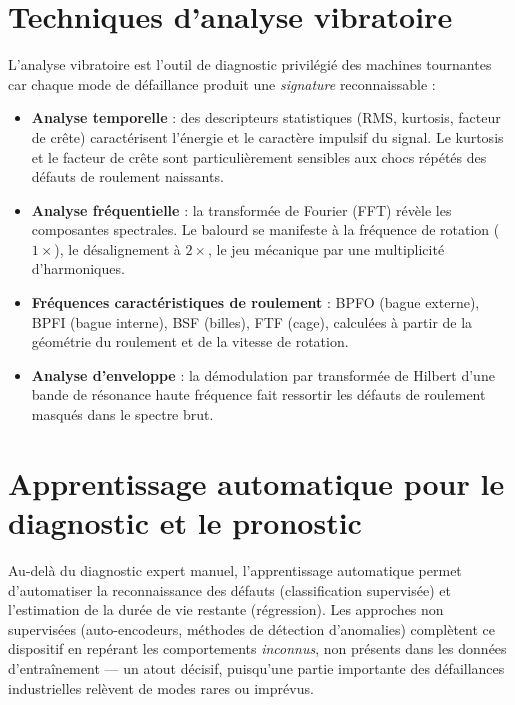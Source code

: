 \section{Techniques d'analyse vibratoire}
L'analyse vibratoire est l'outil de diagnostic privilégié des machines tournantes car
chaque mode de défaillance produit une \emph{signature} reconnaissable :
\begin{itemize}[leftmargin=1.5em]
  \item \textbf{Analyse temporelle} : des descripteurs statistiques (RMS, kurtosis, facteur
        de crête) caractérisent l'énergie et le caractère impulsif du signal. Le kurtosis
        et le facteur de crête sont particulièrement sensibles aux chocs répétés des défauts
        de roulement naissants.
  \item \textbf{Analyse fréquentielle} : la transformée de Fourier (FFT) révèle les
        composantes spectrales. Le balourd se manifeste à la fréquence de rotation
        ($1\times$), le désalignement à $2\times$, le jeu mécanique par une multiplicité
        d'harmoniques.
  \item \textbf{Fréquences caractéristiques de roulement} : BPFO (bague externe), BPFI
        (bague interne), BSF (billes), FTF (cage), calculées à partir de la géométrie du
        roulement et de la vitesse de rotation.
  \item \textbf{Analyse d'enveloppe} : la démodulation par transformée de Hilbert d'une
        bande de résonance haute fréquence fait ressortir les défauts de roulement masqués
        dans le spectre brut.
\end{itemize}

\section{Apprentissage automatique pour le diagnostic et le pronostic}
Au-delà du diagnostic expert manuel, l'apprentissage automatique permet d'automatiser la
reconnaissance des défauts (classification supervisée) et l'estimation de la durée de vie
restante (régression). Les approches non supervisées (auto-encodeurs, méthodes de détection
d'anomalies) complètent ce dispositif en repérant les comportements \emph{inconnus}, non
présents dans les données d'entraînement --- un atout décisif, puisqu'une partie importante
des défaillances industrielles relèvent de modes rares ou imprévus.

